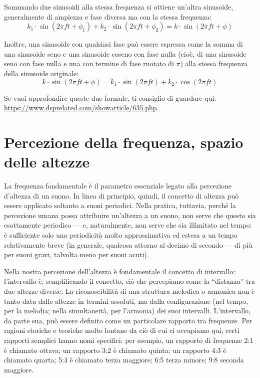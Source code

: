 Sommando due sinusoidi alla stessa frequenza si ottiene un'altra sinusoide, generalmente di ampiezza e fase diversa ma con la stessa frequenza:
\begin{equation}
k_1 \cdot \sin(2 \pi f t + \phi_1) +  k_2 \cdot \sin(2 \pi f t + \phi_2) = k \cdot \sin(2 \pi f t + \phi)
\end{equation}

Inoltre, una sinusoide con qualsiasi fase può essere espressa come la somma di una sinusoide seno e una sinusoide coseno con fase nulla (cioè, di una sinusoide seno con fase nulla e una con termine di fase ruotato di $\pi$) alla stessa frequenza della sinusoide originale:
\begin{equation}
k \cdot \sin(2 \pi f t + \phi) = k_1 \cdot \sin(2 \pi f t) + k_2 \cdot \cos(2 \pi f t)
\end{equation}

Se vuoi approfondire queste due formule, ti consiglio di guardare qui: \url{https://www.dsprelated.com/showarticle/635.php}.



\section{Percezione della frequenza, spazio delle altezze}

La frequenza fondamentale è il parametro essenziale legato alla percezione d'altezza di un suono. In linea di principio, quindi, il concetto di altezza può essere applicato soltanto a suoni periodici. Nella pratica, tuttavia, perché la percezione umana possa attribuire un'altezza a un suono, non serve che questo sia esattamente periodico --- e, naturalmente, non serve che sia illimitato nel tempo: è sufficiente solo una periodicità molto approssimativa ed estesa a un tempo relativamente breve (in generale, qualcosa attorno al decimo di secondo --- di più per suoni gravi, talvolta meno per suoni acuti).

Nella nostra percezione dell'altezza è fondamentale il concetto di intervallo: l'intervallo è, semplificando il concetto, ciò che percepiamo come la ``distanza'' tra due altezze diverse. La riconoscibilità di una struttura melodica o armonica non è tanto data dalle altezze in termini assoluti, ma dalla configurazione (nel tempo, per la melodia; nella simultaneità, per l'armonia) dei suoi intervalli. L'intervallo, da parte sua, può essere definito come un particolare rapporto tra frequenze. Per ragioni storiche e teoriche molto lontane da ciò di cui ci occupiamo qui, certi rapporti semplici hanno nomi specifici: per esempio, un rapporto di frequenze 2:1 è chiamato ottava; un rapporto 3:2 è chiamato quinta; un rapporto 4:3 è chiamato quarta; 5:4 è chiamato terza maggiore; 6:5 terza minore; 9:8 seconda maggiore.%

